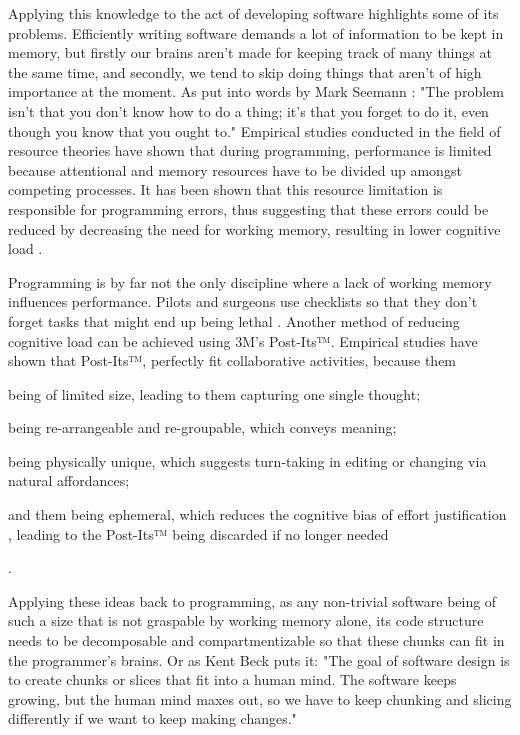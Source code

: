 Applying this knowledge to the act of developing software highlights some of its problems.
Efficiently writing software demands a lot of information to be kept in memory, but firstly our brains aren't made for keeping track of many things at the same time, and secondly, we tend to skip doing things that aren't of high importance at the moment.
As put into words by Mark Seemann \cite{seemann_code_2021}: "The problem isn't that you don't know how to do a thing; it's that you forget to do it, even though you know that you ought to."
Empirical studies conducted in the field of resource theories \cite{ormerod_human_1990} have shown that during programming, performance is limited because attentional and memory resources have to be divided up amongst competing processes.
It has been shown that this resource limitation is responsible for programming errors, thus suggesting that these errors could be reduced by decreasing the need for working memory, resulting in lower cognitive load \cite{ormerod_human_1990}.

Programming is by far not the only discipline where a lack of working memory influences performance.
Pilots and surgeons use checklists so that they don't forget tasks that might end up being lethal \cite{seemann_code_2021}.
Another method of reducing cognitive load can be achieved using 3M's Post-Its™.
Empirical studies \cite{digiano_learning_nodate, dove_grouping_2018} have shown that Post-Its™, perfectly fit collaborative activities, because them
\begin{enumerate*}[label=(\roman*)]
\item being of limited size, leading to them capturing one single thought;
\item being re-arrangeable and re-groupable, which conveys meaning;
\item being physically unique, which suggests turn-taking in editing or changing via natural affordances;
\item and them being ephemeral, which reduces the cognitive bias of effort justification \cite{norton_ikea_2012}, leading to the Post-Its™ being discarded if no longer needed
\end{enumerate*}.

Applying these ideas back to programming, as any non-trivial software being of such a size that is not graspable by working memory alone, its code structure needs to be decomposable and compartmentizable so that these chunks can fit in the programmer's brains.
Or as Kent Beck puts it: "The goal of software design is to create chunks or slices that fit into a human mind. The software keeps growing, but the human mind maxes out, so we have to keep chunking and slicing differently if we want to keep making changes." \cite{beck_goal_2021}


